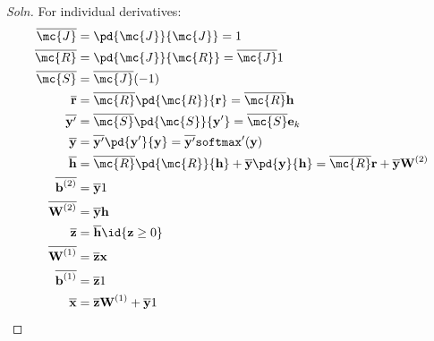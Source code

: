 \documentclass{article}
\begin{document}
	\subsubsection{}
	\begin{proof}[Soln]
		For individual derivatives:
		\begin{align}
			\overline{\mc{J}} &= \pd{\mc{J}}{\mc{J}} = 1 \\
			\overline{\mc{R}} &= \pd{\mc{J}}{\mc{R}} = \overline{\mc{J}}1 \\
			\overline{\mc{S}} &= \overline{\mc{J}} (-1) \\
			\overline{\textbf{r}} &= \overline{\mc{R}} \pd{\mc{R}}{\textbf{r}} = \overline{\mc{R}} \textbf{h} \\
			\overline{\textbf{y}'} &= \overline{\mc{S}} \pd{\mc{S}}{\textbf{y}'} = \overline{\mc{S}} \textbf{e}_k \\
			\overline{\textbf{y}} &= \overline{\textbf{y}'} \pd{\textbf{y}'}{\textbf{y}} = \overline{\textbf{y}'}\texttt{softmax}'(\textbf{y}) \\
			\overline{\textbf{h}} &= \overline{\mc{R}} \pd{\mc{R}}{\textbf{h}} + \overline{\textbf{y}} \pd{\textbf{y}}{\textbf{h}} = \overline{\mc{R}} \textbf{r} + \overline{\textbf{y}} \textbf{W}^{(2)} \\
			\overline{\textbf{b}^{(2)}} &= \overline{\textbf{y}} 1 \\
			\overline{\textbf{W}^{(2)}} &= \overline{\textbf{y}} \textbf{h} \\
			\overline{\textbf{z}} &= \overline{\textbf{h}} \id{\textbf{z} \geq 0} \\
			\overline{\textbf{W}^{(1)}} &= \overline{\textbf{z}} \textbf{x} \\
			\overline{\textbf{b}^{(1)}} &= \overline{\textbf{z}} 1 \\
			\overline{\textbf{x}} &= \overline{\textbf{z}} \textbf{W}^{(1)} + \overline{\textbf{y}} 1
		\end{align}

\end{proof}
\end{document}

